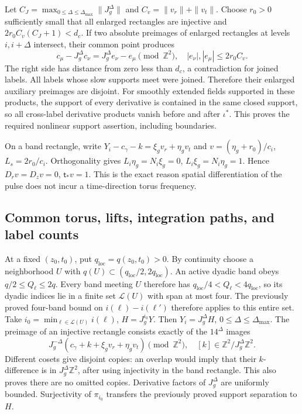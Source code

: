 \documentclass[10pt,a4paper]{article}
\begin{document}
Let \(C_J=\max_{0\le\Delta\le\Delta_{\max}}\|J_g^\Delta\|\) and \(C_v=\|v_r\|+\|v_t\|\). Choose \(r_0>0\) sufficiently small that all enlarged rectangles are injective and \(2r_0 C_v(C_J+1)<d_c\). If two absolute preimages of enlarged rectangles at levels \(i,i+\Delta\) intersect, their common point produces \[
c_\mu-J_g^\Delta c_\nu=J_g^\Delta e_\nu-e_\mu\pmod{\mathbb Z^2},
\quad |e_\nu|,|e_\mu|\le2r_0C_v.
\] The right side has distance from zero less than \(d_c\), a contradiction for joined labels. All labels whose slow supports meet were joined. Therefore their enlarged auxiliary preimages are disjoint. For smoothly extended fields supported in these products, the support of every derivative is contained in the same closed support, so all cross-label derivative products vanish before and after \(\iota^*\). This proves the required nonlinear support assertion, including boundaries.

On a band rectangle, write \(Y_i-c_\gamma-k=\xi_gv_r+\eta_gv_t\) and \(v=(\eta_g+r_0)/c_i\), \(L_s=2r_0/c_i\). Orthogonality gives \(L_i\eta_g=N_i\xi_g=0\), \(L_i\xi_g=N_i\eta_g=1\). Hence \(D_rv=D_zv=0\), \(\mathsf t_*v=1\). This is the exact reason spatial differentiation of the pulse does not incur a time-direction torus frequency.

\subsection{Common torus, lifts, integration paths, and label counts}\label{common-torus-lifts-integration-paths-and-label-counts}

At a fixed \((z_0,t_0)\), put \(q_{\mathrm{loc}}=q(z_0,t_0)>0\).
By continuity choose a neighborhood \(U\) with
\(q(U)\subset(q_{\mathrm{loc}}/2,2q_{\mathrm{loc}})\).
An active dyadic band obeys \(q/2\le Q_\ell\le2q\).
Every band meeting \(U\) therefore has
\(q_{\mathrm{loc}}/4<Q_\ell<4q_{\mathrm{loc}}\), so its dyadic
indices lie in a finite set \(\mathcal L(U)\) with span at most four.
The previously proved four-band bound on \(i(\ell)-i(\ell')\)
therefore applies to this entire set. Take \(i_0=\min_{\ell\in\mathcal L(U)}i(\ell)\), \(H=J_g^{i_0}Y\). Then \(Y_i=J_g^\Delta H\), \(0\le\Delta\le\Delta_{\max}\). The preimage of an injective rectangle consists exactly of the \(14^\Delta\) images \[
J_g^{-\Delta}(c_\gamma+k+\xi_gv_r+\eta_gv_t)\pmod {\mathbb Z^2},
\quad[k]\in\mathbb Z^2/J_g^\Delta\mathbb Z^2.
\] Different cosets give disjoint copies: an overlap would imply that their \(k\)-difference is in \(J_g^\Delta\mathbb Z^2\), after using injectivity in the band rectangle. This also proves there are no omitted copies. Derivative factors of \(J_g^\Delta\) are uniformly bounded. Surjectivity of \(\pi_{i_0}\) transfers the previously proved support separation to \(H\).
\end{document}
